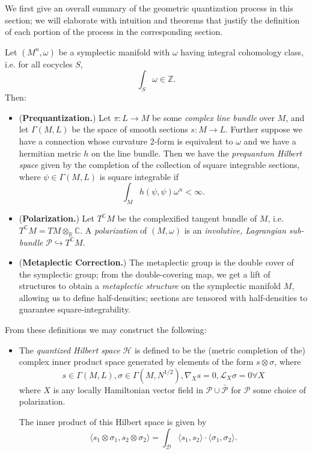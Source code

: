 We first give an overall summary of the geometric quantization process in this section; we will elaborate with intuition and theorems that justify the definition of each portion of the process in the corresponding section.
\begin{defn}
Let $(M^n,\omega)$ be a symplectic manifold with $\omega$ having integral cohomology class, i.e. for all cocycles $S$,
$$
\int_S \omega \in \mathbb{Z}.
$$
Then:
\begin{itemize}
\item (\textbf{Prequantization.}) Let $\pi: L \to M$ be some \emph{complex line bundle} over $M$, and let $\Gamma(M,L)$ be the space of smooth sections $s: M \to L$. Further suppose we have a connection whose curvature 2-form is equivalent to $\omega$ and we have a hermitian metric $h$ on the line bundle. Then we have the \emph{prequantum Hilbert space} given by the completion of the collection of square integrable sections, where $\psi \in \Gamma(M,L)$ is square integrable if
$$
\int_M h(\psi,\psi) \omega^n < \infty.
$$

\item (\textbf{Polarization.}) Let $T^\mathbb{C}M$ be the complexified tangent bundle of $M$, i.e. $T^\mathbb{C}M = TM \otimes_\mathbb{R} \mathbb{C}$. A \emph{polarization} of $(M,\omega)$ is an \emph{involutive, Lagrangian sub-bundle} $\mathcal{P} \hookrightarrow T^\mathbb{C}M$.

\item (\textbf{Metaplectic Correction.}) The metaplectic group is the double cover of the symplectic group; from the double-covering map, we get a lift of structures to obtain a \emph{metaplectic structure} on the symplectic manifold $M$, allowing us to define half-densities; sections are tensored with half-densities to guarantee square-integrability.
\end{itemize}

From these definitions we may construct the following:
\begin{itemize}
\item The \emph{quantized Hilbert space} $\mathcal{H}$ is defined to be the (metric completion of the) complex inner product space generated by elements of the form $s \otimes \sigma$, where
$$
s \in \Gamma(M,L), \sigma \in \Gamma(M, N^{1/2}), \nabla_X s = 0, \mathcal{L}_X \sigma = 0 \forall X
$$
where $X$ is any locally Hamiltonian vector field in $\mathcal{P} \cup \bar{\mathcal{P}}$ for $\mathcal{P}$ some choice of polarization.

The inner product of this Hilbert space is given by
$$
\langle s_1 \otimes \sigma_1, s_2 \otimes \sigma_2 \rangle = \int_\mathcal{D} \langle s_1,s_2 \rangle \cdot \langle \sigma_1,\sigma_2 \rangle.
$$


\end{itemize}
\end{defn}
